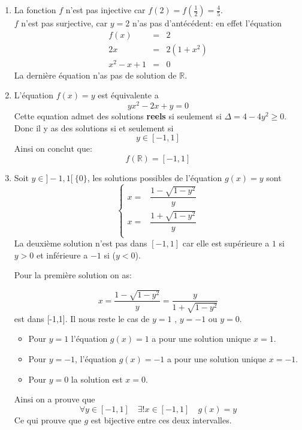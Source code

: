 \documentclass{report}
\begin{document}
\begin{myproof}
 \begin{enumerate}
   \item La fonction $f$ n'est pas injective car $f(2) = f(\frac{1}{2}) =
     \frac{4}{5}$. \\

     $f$ n'est pas surjective, car $y=2$ n'as pas d'antécédent: en effet
     l'équation 
     \begin{eqnarray}
       f(x) & = & 2\\
       2x &=& 2 (1+x^2) \\
       x ^2 - x + 1 &=& 0 
     \end{eqnarray}
     La dernière équation n'as pas de solution de $\mathbb{R}$.
   \item L'équation $f(x) = y$ est équivalente a 
     $$
     yx^2 - 2x + y = 0
     $$
     Cette equation admet des solutions \textbf{reels} si seulement si $\Delta =
     4 - 4y^2 \geq 0$. Donc il y as des solutions si et seulement si 
     $$
     y \in [-1,1]
     $$
     Ainsi on conclut que:
     $$
     f(\mathbb{R}) = [-1,1]
     $$

   \item Soit $y\in ]-1,1[ \ \{0\}$, les solutions possibles de l'équation $g(x)
     = y$ sont
     $$
     \begin{cases}
       x = & \dfrac{1 - \sqrt{1-y^2}}{y} \\[12pt]
       x = & \dfrac{1 + \sqrt{1-y^2}}{y} \\[2pt]
     \end{cases}
     $$
La deuxième solution n'est pas dans $[-1,1]$ car elle est supérieure a $1$ si
$y>0$ et inférieure a $-1$ si ($y<0$).


Pour la première solution on as:

$$
x = \dfrac{1 - \sqrt{1 - y^2}}{y} = \dfrac{y }{ 1 + \sqrt{1 - y^2}}
$$ est dans [-1,1].
Il nous reste le cas de $y=1$ , $y=-1$ ou $y=0$.

\begin{itemize}
  \item Pour $y=1$ l'équation $g(x) = 1$ a pour une solution unique $x=1$.\\
  \item Pour $y=-1$, l'équation $g(x) = -1$ a pour une solution unique $x=-1$.
  \item Pour $y=0$ la solution est $x = 0$.
\end{itemize}
Ainsi on a prouve que 
$$
\forall y \in [-1,1]\quad \exists ! x \in [-1,1] \quad g(x) = y
$$
Ce qui prouve que $g$ est bijective entre ces deux intervalles.
 \end{enumerate} 

\end{myproof}
\end{document}
